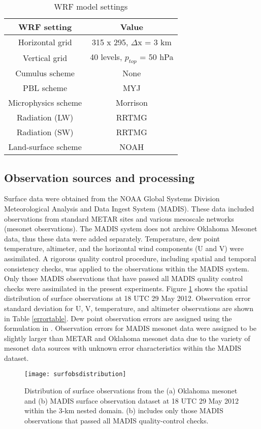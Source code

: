 \begin{table}
\centering
\begin{tabular}{ c || c }
{\bf WRF setting} & {\bf Value} \\ \hline \hline
Horizontal grid & 315 x 295, \(\Delta\)x = 3 km \\ \hline
Vertical grid & 40 levels, \(p_{top}\) = 50 hPa \\ \hline
Cumulus scheme & None \\ \hline
PBL scheme & MYJ \\ \hline
Microphysics scheme & Morrison \\ \hline
Radiation (LW) & RRTMG \\ \hline
Radiation (SW) & RRTMG \\ \hline
Land-surface scheme & NOAH \\ \hline
\end{tabular}
\caption{WRF model settings}
\label{wrftable}
\end{table}

\subsection{Observation sources and processing}
Surface data were obtained from the NOAA Global Systems Division Meteorological Analysis and Data Ingest System (MADIS). These data included observations from standard METAR sites and various mesoscale networks (mesonet observations). The MADIS system does not archive Oklahoma Mesonet data, thus these data were added separately. Temperature, dew point temperature, altimeter, and the horizontal wind components (U and V) were assimilated. A rigorous quality control procedure, including spatial and temporal consistency checks, was applied to the observations within the MADIS system. Only those MADIS observations that have passed all MADIS quality control checks were assimilated in the present experiments. Figure \ref{surfobsdistribution} shows the spatial distribution of surface observations at 18 UTC 29 May 2012. Observation error standard deviation for U, V, temperature, and altimeter observations are shown in Table \ref{errortable}. Dew point observation errors are assigned using the formulation in \citet{linhubbard04}. Observation errors for MADIS mesonet data were assigned to be slightly larger than METAR and Oklahoma mesonet data due to the variety of mesonet data sources with unknown error characteristics within the MADIS dataset.

\begin{figure}
\centering
\texttt{[image: surfobsdistribution]}
\caption{Distribution of surface observations from the (a) Oklahoma mesonet and (b) MADIS surface observation dataset at 18 UTC 29 May 2012 within the 3-km nested domain. (b) includes only those MADIS observations that passed all MADIS quality-control checks.}
\label{surfobsdistribution}
\end{figure}

